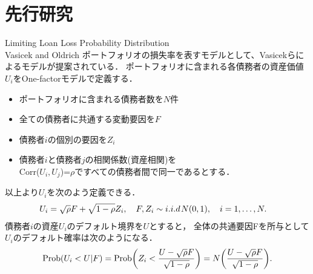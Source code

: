 \documentclass[dvipdfmx]{beamer}
\begin{document}
\section{先行研究}
\begin{frame}{Limiting Loan Loss Probability Distribution\\Vasicek and Oldrich}
ポートフォリオの損失率を表すモデルとして、Vasicekらによるモデルが提案されている．
ポートフォリオに含まれる各債務者の資産価値$U_i$をOne-factorモデルで定義する．\\
\begin{itemize}
\item
ポートフォリオに含まれる債務者数を$N$件
\item
全ての債務者に共通する変動要因を$F$
\item
債務者$i$の個別の要因を$Z_i$
\item
債務者$i$と債務者$j$の相関係数({資産相関})を\\
Corr($U_i,U_j$)=$\rho$ですべての債務者間で同一であるとする．
\end{itemize}
以上より$U_i$を次のよう定義できる．
\begin{eqnarray*}
\label{eq:eq5}
U_{i}=\sqrt{\rho} F+\sqrt {1-\rho}Z_{i}, \hspace{10pt} F,Z_i\sim i.i.d\hspace{1pt} N(0,1),
\hspace{10pt} i=1,\dots,N.\hspace{10pt}
\vspace{-8pt}
\end{eqnarray*}
債務者$i$の資産$U_i$のデフォルト境界を$U$とすると，
全体の共通要因Fを所与として$U_i$のデフォルト確率は次のようになる．
{\small
\begin{eqnarray*}
\label{eq:eq9}
{\rm Prob}(U_i<U|F)={\rm Prob}\biggl(Z_i<\frac{U-\sqrt{\rho}F}{\sqrt{1-\rho}}\biggr)=
N\biggl(\frac{U-\sqrt{\rho}F}{\sqrt{1-\rho}}\biggr).
\end{eqnarray*}
}
\end{frame}
\end{document}
